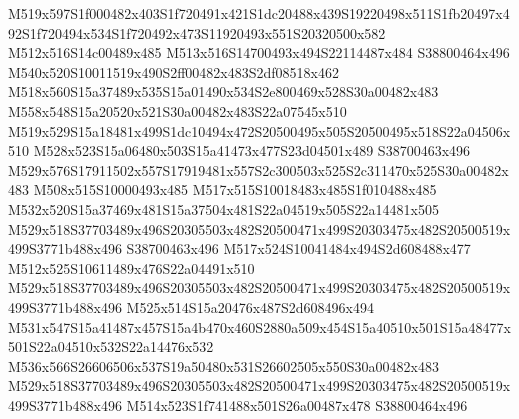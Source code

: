 \documentclass{article}
\begin{document}
\begin{multicols}{2}




M519x597S1f000482x403S1f720491x421S1dc20488x439S19220498x511S1fb20497x492S1f720494x534S1f720492x473S11920493x551S20320500x582 M512x516S14c00489x485 M513x516S14700493x494S22114487x484 S38800464x496 M540x520S10011519x490S2ff00482x483S2df08518x462 M518x560S15a37489x535S15a01490x534S2e800469x528S30a00482x483 M558x548S15a20520x521S30a00482x483S22a07545x510 M519x529S15a18481x499S1dc10494x472S20500495x505S20500495x518S22a04506x510 M528x523S15a06480x503S15a41473x477S23d04501x489 S38700463x496 M529x576S17911502x557S17919481x557S2c300503x525S2c311470x525S30a00482x483 M508x515S10000493x485 M517x515S10018483x485S1f010488x485 M532x520S15a37469x481S15a37504x481S22a04519x505S22a14481x505 M529x518S37703489x496S20305503x482S20500471x499S20303475x482S20500519x499S3771b488x496 S38700463x496 M517x524S10041484x494S2d608488x477 M512x525S10611489x476S22a04491x510 M529x518S37703489x496S20305503x482S20500471x499S20303475x482S20500519x499S3771b488x496 M525x514S15a20476x487S2d608496x494 M531x547S15a41487x457S15a4b470x460S2880a509x454S15a40510x501S15a48477x501S22a04510x532S22a14476x532 M536x566S26606506x537S19a50480x531S26602505x550S30a00482x483 M529x518S37703489x496S20305503x482S20500471x499S20303475x482S20500519x499S3771b488x496 M514x523S1f741488x501S26a00487x478 S38800464x496






\end{multicols}
\end{document}
